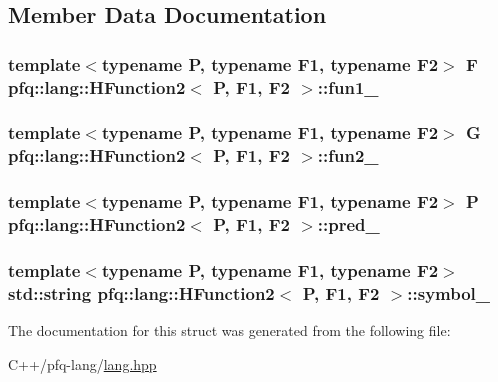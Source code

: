 \subsection{Member Data Documentation}
\hypertarget{structpfq_1_1lang_1_1HFunction2_a709d27ce625bd8f10297e24bea516e62}{
\subsubsection[{fun1\+\_\+}]{\setlength{\rightskip}{0pt plus 5cm}template$<$typename P, typename F1, typename F2$>$ F {\bf pfq\+::lang\+::\+H\+Function2}$<$ P, F1, F2 $>$\+::fun1\+\_\+}}\label{structpfq_1_1lang_1_1HFunction2_a709d27ce625bd8f10297e24bea516e62}
\hypertarget{structpfq_1_1lang_1_1HFunction2_a0f5b702e6d51503fa06e51ea7048b754}{
\subsubsection[{fun2\+\_\+}]{\setlength{\rightskip}{0pt plus 5cm}template$<$typename P, typename F1, typename F2$>$ G {\bf pfq\+::lang\+::\+H\+Function2}$<$ P, F1, F2 $>$\+::fun2\+\_\+}}\label{structpfq_1_1lang_1_1HFunction2_a0f5b702e6d51503fa06e51ea7048b754}
\hypertarget{structpfq_1_1lang_1_1HFunction2_ab87deff7c26d758a0627ad95c39e37db}{
\subsubsection[{pred\+\_\+}]{\setlength{\rightskip}{0pt plus 5cm}template$<$typename P, typename F1, typename F2$>$ P {\bf pfq\+::lang\+::\+H\+Function2}$<$ P, F1, F2 $>$\+::pred\+\_\+}}\label{structpfq_1_1lang_1_1HFunction2_ab87deff7c26d758a0627ad95c39e37db}
\hypertarget{structpfq_1_1lang_1_1HFunction2_af2fa3e1a43ae06688d7160598e934d23}{
\subsubsection[{symbol\+\_\+}]{\setlength{\rightskip}{0pt plus 5cm}template$<$typename P, typename F1, typename F2$>$ std\+::string {\bf pfq\+::lang\+::\+H\+Function2}$<$ P, F1, F2 $>$\+::symbol\+\_\+}}\label{structpfq_1_1lang_1_1HFunction2_af2fa3e1a43ae06688d7160598e934d23}


The documentation for this struct was generated from the following file\+:\begin{DoxyCompactItemize}
\item 
C++/pfq-\/lang/\hyperlink{lang_8hpp}{lang.\+hpp}\end{DoxyCompactItemize}
